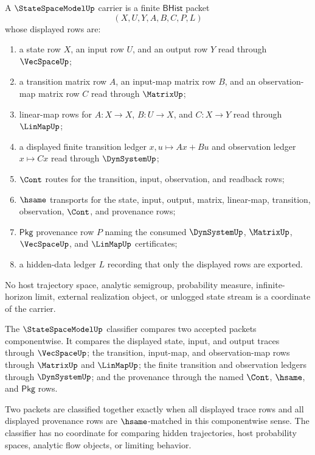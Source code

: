 \begin{definition}
\label{def:statespacemodel-carrier}
A $\StateSpaceModelUp$ carrier is a finite $\mathsf{BHist}$ packet
$$
(X,U,Y,A,B,C,P,L)
$$
whose displayed rows are:
\begin{enumerate}
\item a state row $X$, an input row $U$, and an output row $Y$ read through $\VecSpaceUp$;
\item a transition matrix row $A$, an input-map matrix row $B$, and an observation-map matrix row $C$ read through $\MatrixUp$;
\item linear-map rows for $A:X\to X$, $B:U\to X$, and $C:X\to Y$ read through $\LinMapUp$;
\item a displayed finite transition ledger $x,u\mapsto Ax+Bu$ and observation ledger $x\mapsto Cx$ read through $\DynSystemUp$;
\item $\Cont$ routes for the transition, input, observation, and readback rows;
\item $\hsame$ transports for the state, input, output, matrix, linear-map, transition, observation, $\Cont$, and provenance rows;
\item $\mathsf{Pkg}$ provenance row $P$ naming the consumed $\DynSystemUp$, $\MatrixUp$, $\VecSpaceUp$, and $\LinMapUp$ certificates;
\item a hidden-data ledger $L$ recording that only the displayed rows are exported.
\end{enumerate}
No host trajectory space, analytic semigroup, probability measure, infinite-horizon limit, external realization object, or unlogged state stream is a coordinate of the carrier.
\end{definition}

\begin{definition}
\label{def:statespacemodel-classifier}
The $\StateSpaceModelUp$ classifier compares two accepted packets componentwise. It compares the displayed state, input, and output traces through $\VecSpaceUp$; the transition, input-map, and observation-map rows through $\MatrixUp$ and $\LinMapUp$; the finite transition and observation ledgers through $\DynSystemUp$; and the provenance through the named $\Cont$, $\hsame$, and $\mathsf{Pkg}$ rows.

Two packets are classified together exactly when all displayed trace rows and all displayed provenance rows are $\hsame$-matched in this componentwise sense. The classifier has no coordinate for comparing hidden trajectories, host probability spaces, analytic flow objects, or limiting behavior.
\end{definition}

